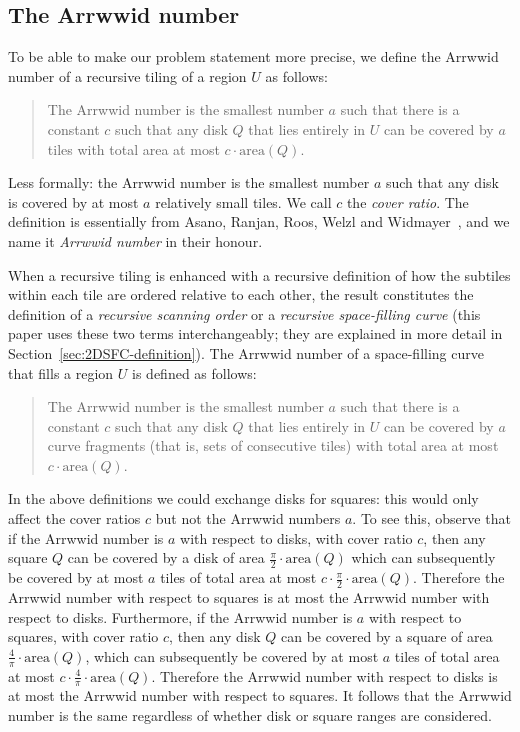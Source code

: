 \documentclass[11pt,a4paper]{article}
\newcommand{\area}{\mathrm{area}}
\newcommand{\unittile}{\ensuremath{U}\xspace}
\begin{document}
\subsection{The Arrwwid number}
To be able to make our problem statement more precise, we define the Arrwwid number of a recursive tiling of a region \unittile as follows:\begin{quote}
The Arrwwid number is the smallest number $a$ such that there is a constant $c$ such that any disk $Q$ that lies entirely in \unittile can be covered by $a$ tiles with total area at most $c \cdot \area(Q)$.
\end{quote}
Less formally: the Arrwwid number is the smallest number $a$ such that any disk is covered by at most $a$ relatively small tiles. We call $c$ the \emph{cover ratio}. The definition is essentially from Asano, Ranjan, Roos, Welzl and Widmayer~\cite{Asano1997}, and we name it \emph{Arrwwid number} in their honour.

When a recursive tiling is enhanced with a recursive definition of how the subtiles within each tile are ordered relative to each other, the result constitutes the definition of a \emph{recursive scanning order} or a \emph{recursive space-filling curve} (this paper uses these two terms interchangeably; they are explained in more detail in Section~\ref{sec:2DSFC-definition}). The Arrwwid number of a space-filling curve that fills a region \unittile is defined as follows:\begin{quote}
The Arrwwid number is the smallest number $a$ such that there is a constant $c$ such that any disk $Q$ that lies entirely in \unittile can be covered by $a$ curve fragments (that is, sets of consecutive tiles) with total area at most $c \cdot \area(Q)$.
\end{quote}

In the above definitions we could exchange disks for squares: this would only affect the cover ratios $c$ but not the Arrwwid numbers $a$. To see this, observe that if the Arrwwid number is $a$ with respect to disks, with cover ratio $c$, then any square $Q$ can be covered by a disk of area $\frac\pi2 \cdot \area(Q)$ which can subsequently be covered by at most $a$ tiles of total area at most $c \cdot \frac\pi2 \cdot \area(Q)$. Therefore the Arrwwid number with respect to squares is at most the Arrwwid number with respect to disks. Furthermore, if the Arrwwid number is $a$ with respect to squares, with cover ratio $c$, then any disk $Q$ can be covered by a square of area $\frac4\pi \cdot \area(Q)$, which can subsequently be covered by at most $a$ tiles of total area at most $c \cdot \frac4\pi \cdot \area(Q)$. Therefore the Arrwwid number with respect to disks is at most the Arrwwid number with respect to squares. It follows that the Arrwwid number is the same regardless of whether disk or square ranges are considered.
\end{document}
